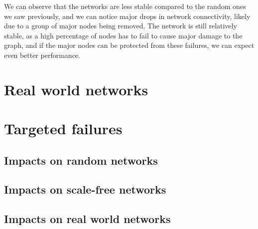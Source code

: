 \documentclass[
]{article}
\begin{document}
We can observe that the networks are less stable compared to the random
ones we saw previously, and we can notice major drops in network
connectivity, likely due to a group of major nodes being removed. The
network is still relatively stable, as a high percentage of nodes has to
fail to cause major damage to the graph, and if the major nodes can be
protected from these failures, we can expect even better performance.

\hypertarget{real-world-networks}{%
\section{Real world networks}\label{real-world-networks}}

\hypertarget{targeted-failures}{%
\section{Targeted failures}\label{targeted-failures}}

\hypertarget{impacts-on-random-networks}{%
\subsection{Impacts on random
networks}\label{impacts-on-random-networks}}

\hypertarget{impacts-on-scale-free-networks}{%
\subsection{Impacts on scale-free
networks}\label{impacts-on-scale-free-networks}}

\hypertarget{impacts-on-real-world-networks}{%
\subsection{Impacts on real world
networks}\label{impacts-on-real-world-networks}}
\end{document}
